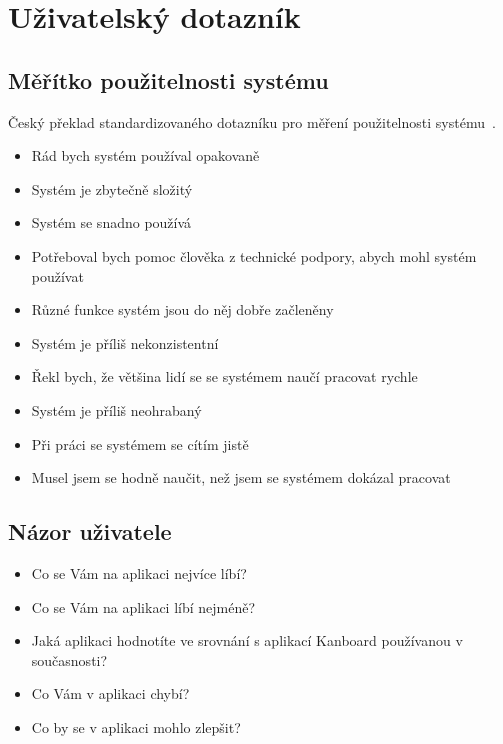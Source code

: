 \chapter{Uživatelský dotazník}\label{sec:questionarre}

\section{Měřítko použitelnosti systému}
Český překlad standardizovaného dotazníku pro měření použitelnosti systému~\cite{bib:sus-cz}.

\begin{itemize}
  \item Rád bych systém používal opakovaně
  \item Systém je zbytečně složitý
  \item Systém se snadno používá
  \item Potřeboval bych pomoc člověka z technické podpory, abych mohl systém používat
  \item Různé funkce systém jsou do něj dobře začleněny
  \item Systém je příliš nekonzistentní
  \item Řekl bych, že většina lidí se se systémem naučí pracovat rychle
  \item Systém je příliš neohrabaný
  \item Při práci se systémem se cítím jistě
  \item Musel jsem se hodně naučit, než jsem se systémem dokázal pracovat
\end{itemize}

\section{Názor uživatele}

\begin{itemize}
  \item Co se Vám na aplikaci nejvíce líbí?
  \item Co se Vám na aplikaci líbí nejméně?
  \item Jaká aplikaci hodnotíte ve srovnání s aplikací Kanboard používanou v současnosti?
  \item Co Vám v aplikaci chybí?
  \item Co by se v aplikaci mohlo zlepšit?
\end{itemize}


